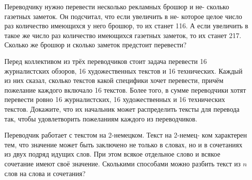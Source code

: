 ﻿
\begin{itemize}

\itA Переводчику нужно перевести несколько рекламных брошюр и не- сколько газетных заметок. Он подсчитал, что если увеличить в не- которое целое число раз количество имеющихся у него брошюр, то их станет 116. А если увеличить в такое же число раз количество имеющихся газетных заметок, то их станет 217. Сколько же брошюр и сколько заметок предстоит перевести?

\itB Перед коллективом из трёх переводчиков стоит задача перевести 16 журналистских обзоров, 16 художественных текстов и 16 технических. Каждый из них сказал, сколько текстов какой специфики хочет перевести, причём пожелание каждого включало 16 текстов. Более того, в сумме переводчики хотят перевести ровно 16 журналистских, 16 художественных и 16 технических текстов. Докажите, что их начальник может распределить тексты для перевода так, чтобы удовлетворить пожеланиям каждого из переводчиков.

\itC Переводчик работает с текстом на 2-немецком. Текст на 2-немец- ком характерен тем, что значение может быть заключено не только в словах, но и в сочетаниях из двух подряд идущих слов. При этом всякое отдельное слово и всякое сочетание имеют своё значение. Сколькими способами можно разбить текст из $n$ слов на слова и сочетания?
\end{itemize}
